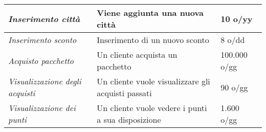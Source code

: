 \begin{center}
\begin{tabularx}{\textwidth}{p{} X p{}}
        \\\midrule
        \emph{Inserimento città} & Viene aggiunta una nuova città & 10 o/yy
        \\\midrule
        \emph{Inserimento sconto} & Inserimento di un nuovo sconto & 8 o/dd
        \\\midrule
        \emph{Acquisto pacchetto} & Un cliente acquista un pacchetto & 100.000 o/gg
        \\\midrule
        \emph{Visualizzazione degli acquisti} & Un cliente vuole visualizzare gli acquisti passati & 90 o/gg
        \\\midrule
        \emph{Visualizzazione dei punti} & Un cliente vuole vedere i punti a sua disposizione & 1.600 o/gg
        \\
    \end{tabularx}
\end{center}